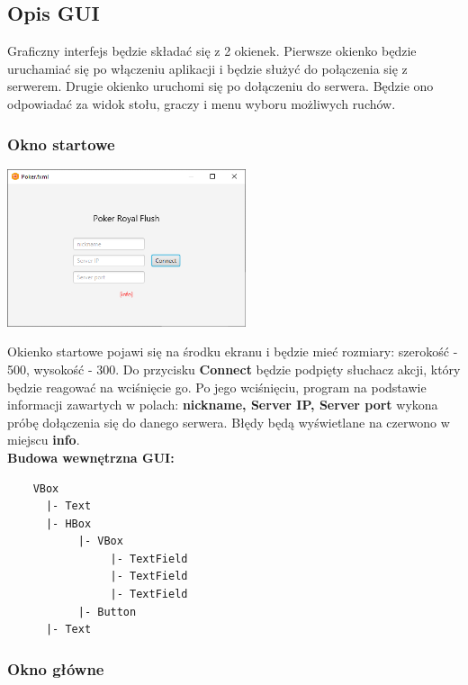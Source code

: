 \documentclass{article}
\begin{document}
    \subsection{Opis GUI}
        Graficzny interfejs będzie składać się z 2 okienek.
        Pierwsze okienko będzie uruchamiać się po włączeniu aplikacji i będzie służyć do połączenia się z serwerem.
        Drugie okienko uruchomi się po dołączeniu do serwera.
        Będzie ono odpowiadać za widok stołu, graczy i menu wyboru możliwych ruchów.
        
        \subsubsection{Okno startowe}
        
            \begin{center}
                \includegraphics[width=70mm]{gui_start.png}
            \end{center}
        
            Okienko startowe pojawi się na środku ekranu i będzie mieć rozmiary: szerokość - 500,  wysokość - 300.
            Do przycisku \textbf{Connect} będzie podpięty słuchacz akcji, który będzie reagować na wciśnięcie go.
            Po jego wciśnięciu, program na podstawie informacji zawartych w polach: \textbf{nickname, Server IP, Server port} wykona próbę dołączenia się do danego serwera.
            Błędy będą wyświetlane na czerwono w miejscu \textbf{info}.
            \\
            \textbf{Budowa wewnętrzna GUI:}
            \begin{verbatim}
    VBox
      |- Text
      |- HBox
           |- VBox
                |- TextField
                |- TextField
                |- TextField
           |- Button
      |- Text
            \end{verbatim}
        
        \subsubsection{Okno główne}
        
\end{document}
